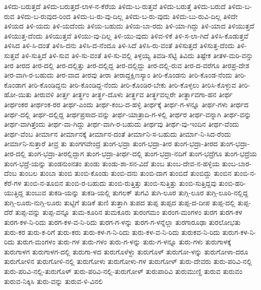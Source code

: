 ತಿಳಿದು-ಬರುತ್ತದೆ
ತಿಳಿದು-ಬರುತ್ತದೆ-ಲಾಳ-ನ-ಕೆರೆಯ
ತಿಳಿದು-ಬ-ರುತ್ತವೆ
ತಿಳಿದು-ಬರುತ್ತೆ
ತಿಳಿದು-ಬರುದೆ
ತಿಳಿದು-ಬ-ರುವ
ತಿಳಿದು-ಬ-ರುವುದ-ರಿಂದ
ತಿಳಿದು-ಬ-ರು-ವು-ದಿಲ್ಲ
ತಿಳಿದು-ಬ-ರು-ವುದು
ತಿಳಿದು-ಬು-ರುವಿ-ದಿಲ್ಲ
ತಿಳಿದೇ
ತಿಳಿಯದ
ತಿಳಿ-ಯದು
ತಿಳಿ-ಯದೆಂದು
ತಿಳಿಯ-ಬಹುದು
ತಿಳಿಯ-ಬಾ-ರದು
ತಿಳಿ-ಯಾ-ಗಿದ್ದು
ತಿಳಿ-ಯಾದ
ತಿಳಿಯುತ್ತದೆ
ತಿಳಿಯುತ್ತ-ದೆಂದು
ತಿಳಿಯುತ್ತವೆ
ತಿಳಿಯು-ವು-ದಿಲ್ಲ
ತಿಳಿ-ಯು-ವುದು
ತಿಳಿವ-ಳಿಕೆ
ತಿಳಿ-ಸ-ಲಾ-ಗಿದೆ
ತಿಳಿಸಿ-ಕೊಡುತ್ತವೆ
ತಿಳಿಸಿದ
ತಿಳಿ-ಸಿ-ದಂತೆ
ತಿಳಿಸಿ-ದನು
ತಿಳಿಸಿ-ದ-ನೆಂದೂ
ತಿಳಿ-ಸಿದೆ
ತಿಳಿಸಿ-ರು-ವಂತೆ
ತಿಳಿಸುತ್ತದೆ
ತಿಳಿಸುತ್ತ-ದೆಂದು
ತಿಳಿ-ಸುತ್ತವೆ
ತಿಳಿ-ಸುತ್ತಿದೆ
ತಿಳಿ-ಸುವ
ತಿಳಿ-ಸು-ವಂತೆ
ತಿಳಿ-ಸು-ವಲ್ಲಿ
ತಿಳ್ಳಯ್ಯ
ತಿವಡಿ-ಸೆಟ್ಟಿ
ತಿವಿದು
ತಿಷ್ಟೇಕ
ತೀತಳ-ಮರಿ-ವನ್ತು
ತೀರ
ತೀರದ
ತೀರ-ದಲ್ಲಿ
ತೀರ-ದಲ್ಲಿತ್ತು
ತೀರ-ದಲ್ಲಿದ್ದ
ತೀರ-ದಲ್ಲಿದ್ದು
ತೀರ-ದಲ್ಲಿ-ರುವ
ತೀರ-ದ-ವರೆಗೂ
ತೀರಪ್ರ-ದೇಶ
ತೀರ-ವಾಗಿ-ರ-ಬಹುದು
ತೀರ-ವಾದ
ತೀರವು
ತೀರಾ
ತೀರಾದ್ದಕ್ಷಿಣಸ್ಯಾಂ
ತೀರಿ-ಕೊಂಡನು
ತೀರಿ-ಕೊಂಡ-ನೆಂದು
ತೀರಿ-ಕೊಂಡಾಗ
ತೀರಿ-ಕೊಂಡಿದ್ದನು
ತೀರಿ-ಕೊಂಡಿದ್ದ-ನೆಂದು
ತೀರಿ-ಕೊಂಡಿರ-ಬೇಕು
ತೀರಿ-ಕೊಳ್ಳಲು
ತೀರಿಸಿ-ಕೊಳ್ಳುವ
ತೀರಿ-ಹೋ-ಯಿತು
ತೀರುವಳಿ
ತೀರ್ತ್ತ
ತೀರ್ತ್ಥಂ
ತೀರ್ತ್ಥ-ದೊಳು
ತೀರ್ತ್ಥವ
ತೀರ್ತ್ಥವಲ್ಲರೇ
ತೀರ್ತ್ಥಾವಗಾ-ಹನ
ತೀರ್ಥ
ತೀರ್ಥಂಕರ
ತೀರ್ಥಂಕ-ರರ
ತೀರ್ಥ-ಎಂದು
ತೀರ್ಥ-ಕಂಬ-ದ-ಹಳ್ಳಿ
ತೀರ್ಥಕ್ಕೆ
ತೀರ್ಥ-ಗ-ಳನ್ನೂ
ತೀರ್ಥ-ಗಳು
ತೀರ್ಥದ
ತೀರ್ಥ-ದಲ್ಲಿ
ತೀರ್ಥ-ದಲ್ಲಿದ್ದ
ತೀರ್ಥಪ್ರಸಾದ-ವನ್ನು
ತೀರ್ಥ-ಯಾತ್ರಾದಿ-ಗ-ಳಲ್ಲಿ
ತೀರ್ಥರ
ತೀರ್ಥ-ವನ್ನಾಗಿ
ತೀರ್ಥ-ವನ್ನು
ತೀರ್ಥ-ವಾಗಿತ್ತೆಂದು
ತೀರ್ಥ-ವಾ-ಗಿದ್ದು
ತೀರ್ಥ-ವಾಗಿ-ರ-ಬಹುದು
ತೀರ್ಥವು
ತೀರ್ಥ-ವು-ಇಂದಿನ
ತೀರ್ಥ-ವೆಂದು
ತೀರ್ಥ-ವೆಂಬ
ತೀರ್ಮಾನ
ತೀರ್ಮಾನಕ್ಕೆ
ತೀರ್ಮಾನ-ದಂತೆ
ತೀರ್ಮಾನಿ-ಸ-ಬಹುದು
ತೀರ್ಮಾ-ನಿ-ಸಿದ-ರೆಂದು
ತೀರ್ಮಾನಿ-ಸುತ್ತಾರೆ
ತೀವ್ರ
ತು
ತುಂಗಗವೇಂದ್ರ
ತುಂಗ-ಭದ್ರಾ
ತುಂಗ-ಭದ್ರಾ-ತೀರ
ತುಂಗ-ಭದ್ರಾ-ತೀರದ
ತುಂಗ-ಭದ್ರಾ-ತೀರ-ದಲ್ಲಿ
ತುಂಗ-ಭದ್ರಾ-ತೀರಲ್ಲಿದ್ದಾಗ
ತುಂಗ-ಭದ್ರಾ-ತೀರ್ಥ-ದಲ್ಲಿ
ತುಂಗ-ಭದ್ರಾ-ನದಿಗೆ
ತುಂಗ-ಭದ್ರೆಗೂ
ತುಂಗ-ಭದ್ರೆಯ
ತುಂಗ-ಭದ್ರೆ-ಯನ್ನು
ತುಂಡನುಂನತಂ
ತುಂಡು
ತುಂಡು-ಶಾ-ಸನ-ವಿದೆ
ತುಂಬ
ತುಂಬ-ದೇವ-ನ-ಹಳ್ಳಿಯ
ತುಂಬ-ಬಾರ-ದೆಂಬ
ತುಂಬಲ
ತುಂಬಾ
ತುಂಬಿ
ತುಂಬಿ-ಕೊಂಡು
ತುಂಬಿ-ದನು
ತುಂಬಿ-ದಾಗ
ತುಂಬಿದೆ
ತುಂಬಿದ್ದು
ತುಂಬಿನ
ತುಂಬಿ-ನ-ಕೆರೆ-ಗಳ
ತುಂಬಿ-ನ-ತೂಬಿನ
ತುಂಬಿ-ರ-ಬಹುದು
ತುಂಬಿ-ರುತ್ತಿತ್ತು
ತುಂಬಿ-ಸುತ್ತಿತ್ತು
ತುಂಬಿ-ಸುತ್ತಿದ್ದವು
ತುಂಬಿ-ಹರಿ-ಯುತ್ತಿದ್ದ
ತುಂಬುವ
ತುಕಡಿ-ಯನ್ನು
ತುಕಡಿ-ಯಲ್ಲಿ
ತುಗಲಕ್
ತುಗವಿ
ತುಗಿ-ಲೂರ
ತುಗ್ಗಿ-ಲೂರ
ತುಗ್ಗಿ-ಲೂರಿ-ನಲ್ಲಿದ್ದ
ತುಗ್ಗಿ-ಲೂರು-ನುಗ್ಗಿ-ಲೂರು
ತುಟ್ಟಿಗೆ
ತುಡಿಕೆ
ತುಣಿ
ತುತ್ತಾಗಿ
ತುಪದ
ತುಪ್ಪ
ತುಪ್ಪದ
ತುಪ್ಪ-ದ-ದೀಪ
ತುಪ್ಪ-ದಲ್ಲಿ
ತುಪ್ಪ-ದೆರೆ
ತುಪ್ಪ-ವನ್ನು
ತುಪ್ಪ-ವನ್ನೂ
ತುಮ-ಕೂರಿನ
ತುಮಕೂರು
ತುರಂಗಮಂ
ತುರಂಗ-ಮಂಗಳಂ
ತುರಗ
ತುರಗ-ಕಳ
ತುರಗ-ಕಳ-ನಿ-ರಿದು
ತುರಗ-ಕಳ-ವ-ನಿ-ರಿದು
ತುರಗ-ಗ-ಳನ್ನು
ತುರಗ-ಗ-ಳನ್ನೆಲ್ಲಾ
ತುರಗಾರೂಢಾ
ತುರಲೋಭತು
ತುರು-ಕರ
ತುರು-ಕ-ರಿಗೆ
ತುರು-ಕರು
ತುರು-ಕಳ-ಗ-ನಿ-ರಿದು
ತುರು-ಕಳ-ವ-ನಿ-ರಿದು
ತುರುಕವ-ನಿ-ರಿದು
ತುರುಗ-ಕಳ-ನಿ-ರಿದು
ತುರುಗ-ಮಂಗಳಂ
ತುರು-ಗಳ
ತುರು-ಗಳಂ
ತುರು-ಗ-ಳನ್ನು
ತುರು-ಗ-ಳನ್ನೂ
ತುರು-ಗಳು
ತುರುಗಾಳಕ್ಕೆ
ತುರುಗಾಳಗ
ತುರುಗಾಳಗ-ದಲ್ಲಿ
ತುರುಗಾ-ಳದ
ತುರುಗೊಳೆಳ್ದು
ತುರುಗೊಳ್
ತುರುಗೋ-ಳನ್ನು
ತುರುಗೋಳಾ-ದರೂ
ತುರುಗೋಳಿನ
ತುರುಗೋಳಿ-ನಲ್ಲಿ
ತುರುಗೋಳು
ತುರುಗೋಳು-ಗಳ
ತುರುಗೋಳ್
ತುರು-ದೇವರು
ತುರು-ಪರಿವಿ-ನಲ್ಲಿ
ತುರು-ಪರಿವಿ-ನಲ್ಲಿ-ತುರುಗೊಳ್
ತುರು-ಪರಿವಿ-ನಲ್ಲಿ-ತುರುಗೋಳ್
ತುರುಪಾರಿವಿ
ತುರುಮುಣ್ಡಿ
ತುರುವ
ತುರುವಂ
ತುರುವ-ನಿಕ್ಕಿಸಿ
ತುರು-ವನ್ನು
ತುರುವ-ಳಿ-ವಿನಲಿ
